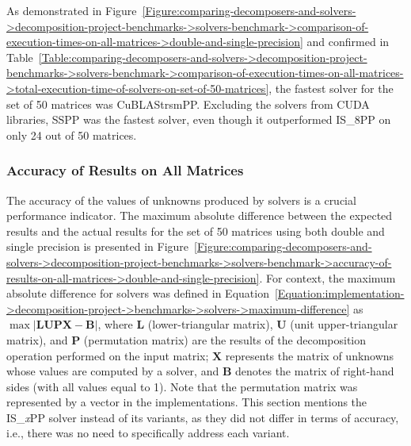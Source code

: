 As demonstrated in Figure~\ref{Figure:comparing-decomposers-and-solvers->decomposition-project-benchmarks->solvers-benchmark->comparison-of-execution-times-on-all-matrices->double-and-single-precision} and confirmed in Table~\ref{Table:comparing-decomposers-and-solvers->decomposition-project-benchmarks->solvers-benchmark->comparison-of-execution-times-on-all-matrices->total-execution-time-of-solvers-on-set-of-50-matrices}, the fastest solver for the set of 50 matrices was CuBLAStrsmPP.
Excluding the solvers from CUDA libraries, SSPP was the fastest solver, even though it outperformed IS\_8PP on only 24 out of 50 matrices.


\subsubsection{Accuracy of Results on All Matrices}\label{Subsection:comparing-decomposers-and-solvers->decomposition-project-benchmarks->solvers-benchmark->accuracy-of-results-on-all-matrices}
The accuracy of the values of unknowns produced by solvers is a crucial performance indicator.
The maximum absolute difference between the expected results and the actual results for the set of 50 matrices using both double and single precision is presented in Figure~\ref{Figure:comparing-decomposers-and-solvers->decomposition-project-benchmarks->solvers-benchmark->accuracy-of-results-on-all-matrices->double-and-single-precision}.
For context, the maximum absolute difference for solvers was defined in Equation~\ref{Equation:implementation->decomposition-project->benchmarks->solvers->maximum-difference} as $\max \left| \mathbf{LUPX} - \mathbf{B} \right|$, where $\mathbf{L}$ (lower-triangular matrix), $\mathbf{U}$ (unit upper-triangular matrix), and $\mathbf{P}$ (permutation matrix) are the results of the decomposition operation performed on the input matrix; $\mathbf{X}$ represents the matrix of unknowns whose values are computed by a solver, and $\mathbf{B}$ denotes the matrix of right-hand sides (with all values equal to 1).
Note that the permutation matrix was represented by a vector in the implementations.
This section mentions the IS\_\textit{x}PP solver instead of its variants, as they did not differ in terms of accuracy, i.e., there was no need to specifically address each variant.

